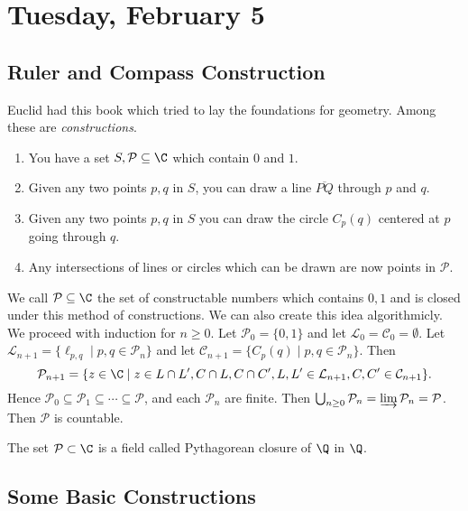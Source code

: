 
\section{Tuesday, February 5}

\subsection{Ruler and Compass Construction}

Euclid had this book which tried to lay the foundations for geometry. Among these are \emph{constructions}.

\begin{enumerate}
\item You have a set $S, \mathcal{P} \subseteq \C$ which contain $0$ and $1$.
\item Given any two points $p,q$ in $S$, you can draw a line $\overline{PQ}$ through $p$ and $q$.
\item Given any two points $p,q$ in $S$ you can draw the circle $C_p(q)$ centered at $p$ going through $q$.
\item Any intersections of lines or circles which can be drawn are now points in $\mathcal{P}$.
\end{enumerate}

We call $\mathcal{P} \subseteq \C$ the set of constructable numbers which contains $0,1$ and is closed under this method of constructions. We can also create this idea algorithmicly. We proceed with induction for $n \geq 0$. Let $\mathcal{P}_0 = \{0,1\}$ and let $\mathcal{L}_0 = \mathcal{C}_0 = \emptyset$. Let $\mathcal{L}_{n+1} = \{\ell_{p,q} \mid p,q \in \mathcal{P}_n\}$ and let $\mathcal{C}_{n+1} = \{C_p(q) \mid p,q \in \mathcal{P}_{n}\}$. Then \[\mathcal{P}_{n+1} = \{z \in \C \mid z \in L \cap L', C \cap L, C \cap C', L,L' \in \mathcal{L}_{n+1},C,C' \in \mathcal{C}_{n+1}\}.\]
Hence $\mathcal{P}_0 \subseteq \mathcal{P}_1 \subseteq \cdots \subseteq \mathcal{P}$, and each $\mathcal{P}_n$ are finite. Then $\bigcup_{n \geq 0} \mathcal{P}_n = \varinjlim \mathcal{P}_n = \mathcal{P}$. Then $\mathcal{P}$ is countable.

\begin{theorem}
The set $\mathcal{P} \subset \C$ is a field called Pythagorean closure of $\Q$ in $\Q$.
\end{theorem}

\subsection{Some Basic Constructions}

